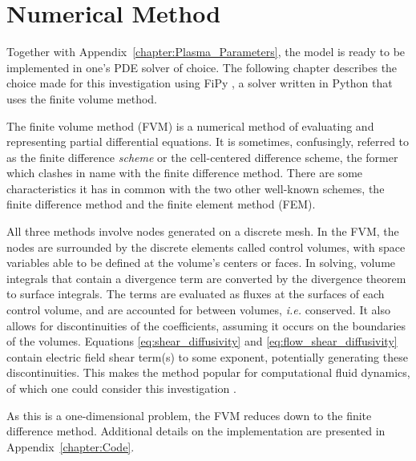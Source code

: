 \section{Numerical Method}\label{sec:numerical_method}
Together with Appendix~\ref{chapter:Plasma_Parameters}, the model is ready to be implemented in one's PDE solver of choice.
The following chapter describes the choice made for this investigation using FiPy \cite{guyer_fipy:_2009}, a solver written in Python  that uses the finite volume method.

The finite volume method (FVM) is a numerical method of evaluating and representing partial differential equations.
It is sometimes, confusingly, referred to as the finite difference \emph{scheme} or the cell-centered difference scheme, the former which clashes in name with the finite difference method.
There are some characteristics it has in common with the two other well-known schemes, the finite difference method and the finite element method (FEM).

All three methods involve nodes generated on a discrete mesh.
In the FVM, the nodes are surrounded by the discrete elements called control volumes, with space variables able to be defined at the volume's centers or faces.
In solving, volume integrals that contain a divergence term are converted by the divergence theorem to surface integrals.
The terms are evaluated as fluxes at the surfaces of each control volume, and are accounted for between volumes, \emph{i.e.} conserved.
It also allows for discontinuities of the coefficients, assuming it occurs on the boundaries of the volumes.
Equations \ref{eq:shear_diffusivity} and \ref{eq:flow_shear_diffusivity} contain electric field shear term(s) to some exponent, potentially generating these discontinuities.
This makes the method popular for computational fluid dynamics, of which one could consider this investigation \cite{eymard_finite_2003}.


As this is a one-dimensional problem, the FVM reduces down to the finite difference method.
Additional details on the implementation are presented in Appendix~\ref{chapter:Code}.

